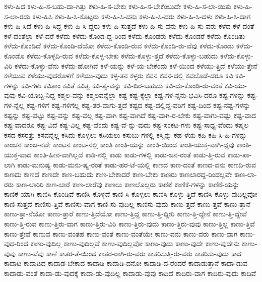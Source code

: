 {ಕಳು-ಹಿದ
ಕಳು-ಹಿ-ಸ-ಬಹು-ದಾ-ಗಿತ್ತು
ಕಳು-ಹಿ-ಸ-ಬೇಕು
ಕಳು-ಹಿ-ಸ-ಬೇಕೆಂಬುದೇ
ಕಳು-ಹಿ-ಸ-ಲಾ-ಯಿತು
ಕಳು-ಹಿ-ಸ-ಲಾ-ರದು
ಕಳು-ಹಿಸಿ
ಕಳು-ಹಿ-ಸಿ-ಕೊಟ್ಟರು
ಕಳು-ಹಿ-ಸಿ-ದನು
ಕಳು-ಹಿ-ಸಿ-ದರು
ಕಳು-ಹಿ-ಸಿ-ದಳು
ಕಳು-ಹಿ-ಸಿ-ದಾಗ
ಕಳು-ಹಿ-ಸಿದೆ
ಕಳು-ಹಿ-ಸಿದ್ದ
ಕಳು-ಹಿ-ಸಿ-ದ್ದರು
ಕಳು-ಹಿ-ಸುತ್ತದೆ
ಕಳು-ಹಿ-ಸು-ವನು
ಕಳು-ಹಿ-ಸು-ವರು
ಕಳೆದ
ಕಳೆ-ದಂತೆ
ಕಳೆ-ದಂತೆಲ್ಲಾ
ಕಳೆ-ದರೆ
ಕಳೆದು
ಕಳೆದು-ಕೊಂಡ-ದ್ದ-ರಿಂದ
ಕಳೆದು-ಕೊಂಡರು
ಕಳೆದು-ಕೊಂಡರೆ
ಕಳೆದು-ಕೊಂಡಿತು
ಕಳೆದು-ಕೊಂಡಿದೆ
ಕಳೆದು-ಕೊಂಡಿ-ದೆಯೋ
ಕಳೆದು-ಕೊಂಡಿ-ರುವ
ಕಳೆದು-ಕೊಂಡಿ-ರು-ವೆವು
ಕಳೆದು-ಕೊಂಡು
ಕಳೆದು-ಕೊಂಡೊ
ಕಳೆದು-ಕೊಳ್ಳದಿ-ರುವ
ಕಳೆದು-ಕೊಳ್ಳ-ಬೇಕು
ಕಳೆದು-ಕೊಳ್ಳು-ತ್ತದೆ
ಕಳೆದು-ಕೊಳ್ಳು-ಬಹುದು
ಕಳೆದು-ಕೊಳ್ಳು-ವಿರಿ
ಕಳೆದು-ಕೊಳ್ಳು-ವೆನು
ಕಳೆದು-ಹೋಗಿವೆ
ಕಳೆ-ಯನ್ನು
ಕಳೆ-ಯ-ಬೇಕೆಂದು
ಕಳೆ-ಯಿಂದ
ಕಳೆಯು-ತ್ತಿದೆ
ಕಳೆಯು-ತ್ತೇನೆ
ಕಳೆಯುವ
ಕಳೆಯು-ವುದರೊಳಗೆ
ಕಳೆಯು-ವುದು
ಕಳ್ಳ-ತನ
ಕಳ್ಳರು
ಕವನ
ಕವನ-ದಲ್ಲಿ
ಕವಲೊಡೆ-ದರೂ
ಕವಿ
ಕವಿ-ಗಳನ್ನು
ಕವಿ-ಗಳು
ಕವಿತಾಂ
ಕವಿತೆ
ಕವಿತ್ವ
ಕವಿ-ತ್ವ-ವನ್ನು
ಕವಿ-ದಿರ-ಬಹುದು
ಕವಿ-ದು-ಕೊಂಡಿ-ರು-ವಂತೆ
ಕವಿ-ಯು-ವುವು
ಕವಿ-ಯೊಬ್ಬ-ನಿದ್ದ
ಕಶ್ಮಲ-ವನ್ನು
ಕಶ್ಮಲವನ್ನೆಲ್ಲಾ
ಕಷ್ಟ
ಕಷ್ಟ-ಕ್ಕೆಲ್ಲಾ
ಕಷ್ಟ-ಗಳ-ನ್ನನು-ಭವಿಸಿ-ದರೂ
ಕಷ್ಟ-ಗಳನ್ನು
ಕಷ್ಟ-ಗಳ-ನ್ನೆಲ್ಲ
ಕಷ್ಟ-ಗಳಿಗೆ
ಕಷ್ಟ-ಗಳಿಗೆಲ್ಲ
ಕಷ್ಟ-ತರ-ವಾಗು-ತ್ತದೆ
ಕಷ್ಟದ
ಕಷ್ಟ-ದಲ್ಲಿದ್ದ-ವರಿಗೆ
ಕಷ್ಟ-ದಿಂದ
ಕಷ್ಟ-ನಷ್ಟ-ಗಳನ್ನು
ಕಷ್ಟನ್ನು
ಕಷ್ಟ-ಪಟ್ಟು
ಕಷ್ಟ-ವನ್ನು
ಕಷ್ಟ-ವಲ್ಲ
ಕಷ್ಟ-ವಾಗಿ
ಕಷ್ಟ-ವಾಗಿದೆ
ಕಷ್ಟ-ವಾಗಿ-ರ-ಬೇಕು
ಕಷ್ಟ-ವಾಗು-ವಷ್ಟು
ಕಷ್ಟ-ವಾದ
ಕಷ್ಟ-ವಾದರೂ
ಕಷ್ಟ-ವಿದೆ
ಕಷ್ಟ-ವಿಲ್ಲ
ಕಷ್ಟ-ವೆಂದು
ಕಷ್ಟ-ವೆ-ನ್ನು-ವುದು
ಕಷ್ಟ-ಸಂಕಟ-ಗಳು
ಕಷ್ಟ-ಸಾಧ್ಯ-ವೆಂದು
ಕಷ್ಮಲ
ಕಸದ
ಕಸರತ್ತು
ಕಸವನ್ನೆಲ್ಲ
ಕಸಿದು-ಕೊಳ್ಳಲು
ಕಸಿಯಲು
ಕಸುಬು-ಗಳಲ್ಲಿ
ಕಸ್ಮಿನ್ನು
ಕಹ-ಳೆಯ
ಕಹಿ
ಕಹಿ-ಸಿ-ಹಿ-ಗಳನ್ನು
ಕಾಂಚನ
ಕಾಂಚ-ನವೇ
ಕಾಂಟನ
ಕಾಂಟ-ನಲ್ಲಿ
ಕಾಂತಿ
ಕಾಂತಿ-ಯನ್ನು
ಕಾಂತಿ-ಯಿಂದ
ಕಾಂತಿ-ಯುಕ್ತ-ವಾಗಿ-ದ್ದವು
ಕಾಂತಿ-ಯುಕ್ತ-ವಾದ
ಕಾಂತಿ-ಹೀನ-ವಾಗಿಲ್ಲದೆ
ಕಾಡಿ-ನಲ್ಲಿ
ಕಾಡು
ಕಾಡು-ಗಳಲ್ಲಿ
ಕಾಡು-ಜನ-ರಂತೆ
ಕಾಡು-ತ್ತಿ-ರುವ
ಕಾಡು-ಪಾ-ಲಾಗಿ
ಕಾಡು-ಮನುಷ್ಯ
ಕಾಡು-ಮನು-ಷ್ಯ-ರಂತೆ
ಕಾಡು-ಹರ-ಟೆ-ಯಲ್ಲಿ
ಕಾಣದ
ಕಾಣ-ದಂತೆ
ಕಾಣದ-ವನು
ಕಾಣದಿ-ರುವ
ಕಾಣದು
ಕಾಣದೆ
ಕಾಣದೇ
ಕಾಣ-ಬಹುದು
ಕಾಣ-ಬೇಕಾದರೆ
ಕಾಣ-ಬೇಕು
ಕಾಣರು
ಕಾಣಲಾರದ್ದ-ರಿಂದಲ್ಲವೇ
ಕಾಣ-ಲಾ-ರರು
ಕಾಣ-ಲಾರಿರಿ
ಕಾಣ-ಲಾರೆ
ಕಾಣ-ಲಾರೆವು
ಕಾಣಲು
ಕಾಣಲೊಲ್ಲರು
ಕಾಣಿಕೆ
ಕಾಣಿಕೆ-ಗಳನ್ನು
ಕಾಣಿಕೆ-ಯನ್ನು
ಕಾಣಿಕೆ-ಯಾಗಿ
ಕಾಣಿಸಿ-ಕೊಂಡಿವೆ
ಕಾಣಿಸಿ-ಕೊಳ್ಳದೆ
ಕಾಣಿ-ಸಿ-ಕೊಳ್ಳಲು
ಕಾಣಿಸಿ-ಕೊಳ್ಳು-ತ್ತಿದೆ
ಕಾಣಿಸಿ-ಕೊಳ್ಳು-ವುದಿಲ್ಲವೋ
ಕಾಣಿ-ಸುತ್ತದೆ
ಕಾಣಿಸು-ತ್ತಿವೆ
ಕಾಣಿಸು-ವಾಗ
ಕಾಣಿ-ಸು-ವುದಿಲ್ಲ
ಕಾಣಿಸು-ವುದು
ಕಾಣು-ತ್ತದೆ
ಕಾಣು-ತ್ತವೆ
ಕಾಣು-ತ್ತಾನೆ
ಕಾಣು-ತ್ತಾ-ನೆಯೋ
ಕಾಣು-ತ್ತಾರೆ
ಕಾಣು-ತ್ತಿದೆಯೋ
ಕಾಣು-ತ್ತಿದ್ದ
ಕಾಣು-ತ್ತಿ-ದ್ದೀರಿ
ಕಾಣು-ತ್ತಿ-ದ್ದೇನೆ
ಕಾಣು-ತ್ತಿ-ದ್ದೇವೆ
ಕಾಣು-ತ್ತಿ-ರುವ
ಕಾಣು-ತ್ತಿರು-ವಾಗ
ಕಾಣು-ತ್ತಿರು-ವಿರಿ
ಕಾಣು-ತ್ತಿರು-ವುದು
ಕಾಣು-ತ್ತಿರು-ವುವು
ಕಾಣು-ತ್ತಿಲ್ಲ
ಕಾಣು-ತ್ತಿವೆ
ಕಾಣು-ತ್ತೇವೆ
ಕಾಣುವ
ಕಾಣು-ವಂತಹ
ಕಾಣು-ವಂತೆ
ಕಾಣು-ವಂತೆಯೇ
ಕಾಣು-ವನು
ಕಾಣು-ವರು
ಕಾಣು-ವಾಗ
ಕಾಣು-ವುದ-ರಿಂದ
ಕಾಣು-ವುದಿಲ್ಲ
ಕಾಣು-ವುದಿಲ್ಲವೆ
ಕಾಣು-ವುದಿಲ್ಲವೋ
ಕಾಣು-ವುದು
ಕಾಣು-ವುದೇ
ಕಾಣು-ವುದೇನು
ಕಾಣು-ವುವು
ಕಾಣು-ವೆವು
ಕಾಣೆ
ಕಾತರ-ತೆ-ಯಿಂದ
ಕಾತರ-ರಾಗಿ-ರು-ವರು
ಕಾತರಿಸುತ್ತಿ-ರು-ವರು
ಕಾತರಿಸು-ವುದು
ಕಾದ
ಕಾದಾಟ
ಕಾದಾಟದ
ಕಾದಾಡ-ಬೇಕಾದ
ಕಾದಾಡಿ
ಕಾದಾಡಿ-ದನೋ
ಕಾದಾಡಿ-ದ-ರೆಂದರೆ
ಕಾದಾಡುತ್ತಾನೆ
ಕಾದಾ-ಡುವ
ಕಾದಾಡು-ವಂತೆ
ಕಾದಾ-ಡು-ವುದಕ್ಕೆ
ಕಾದಾ-ಡು-ವುದಿಲ್ಲ
ಕಾದಾಡು-ವುವು
ಕಾದಿದೆ
ಕಾದಿರು-ವಾಗ
ಕಾದಿರು-ವುದು
ಕಾದಿವೆ
}
